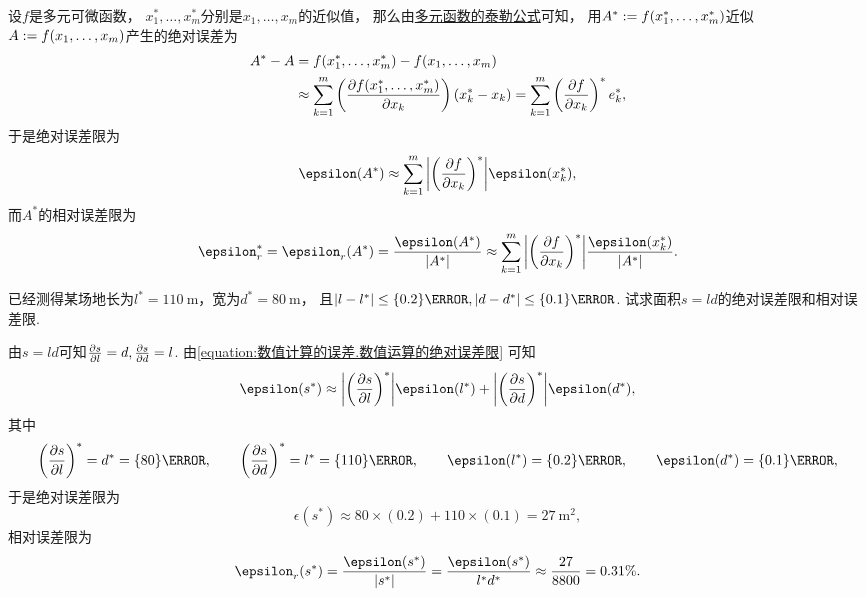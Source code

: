 设\(f\)是多元可微函数，
\(x^*_1,\dotsc,x^*_m\)分别是\(x_1,\dotsc,x_m\)的近似值，
那么由\hyperref[theorem:多元函数微分法.多元函数的泰勒公式]{多元函数的泰勒公式}可知，
用\(A^* := f(x^*_1,\dotsc,x^*_m)\)近似\(A := f(x_1,\dotsc,x_m)\)产生的绝对误差为\begin{align*}
	A^* - A
	&= f(x^*_1,\dotsc,x^*_m) - f(x_1,\dotsc,x_m) \\
	&\approx \sum_{k=1}^m \left( \pdv{f(x^*_1,\dotsc,x^*_m)}{x_k} \right) (x^*_k - x_k)
	= \sum_{k=1}^m \left( \pdv{f}{x_k} \right)^* e^*_k,
\end{align*}
于是绝对误差限为\begin{equation}\label{equation:数值计算的误差.数值运算的绝对误差限}
	\epsilon(A^*)
	\approx \sum_{k=1}^m \abs{\left( \pdv{f}{x_k} \right)^*} \epsilon(x^*_k),
\end{equation}
而\(A^*\)的相对误差限为\begin{equation}\label{equation:数值计算的误差.数值运算的相对误差限}
	\epsilon^*_r
	= \epsilon_r(A^*)
	= \frac{\epsilon(A^*)}{\abs{A^*}}
	\approx \sum_{k=1}^m \abs{\left( \pdv{f}{x_k} \right)^*} \frac{\epsilon(x^*_k)}{\abs{A^*}}.
\end{equation}

\begin{example}
已经测得某场地长为\(l^* = \qty{110}{\meter}\)，宽为\(d^* = \qty{80}{\meter}\)，
且\(
	\abs{l-l^*} \leq \qty{0.2}{\meter},
	\abs{d-d^*} \leq \qty{0.1}{\meter}
\).
试求面积\(s = l d\)的绝对误差限和相对误差限.
\begin{solution}
由\(s = l d\)可知\(\pdv{s}{l} = d, \pdv{s}{d} = l\).
由\cref{equation:数值计算的误差.数值运算的绝对误差限} 可知\begin{equation*}
	\epsilon(s^*)
	\approx \abs{\left( \pdv{s}{l} \right)^*} \epsilon(l^*)
	+ \abs{\left( \pdv{s}{d} \right)^*} \epsilon(d^*),
\end{equation*}
其中\begin{equation*}
	\left( \pdv{s}{l} \right)^*
	= d^*
	= \qty{80}{\meter},
	\qquad
	\left( \pdv{s}{d} \right)^*
	= l^*
	= \qty{110}{\meter},
	\qquad
	\epsilon(l^*) = \qty{0.2}{\meter},
	\qquad
	\epsilon(d^*) = \qty{0.1}{\meter},
\end{equation*}
于是绝对误差限为\begin{equation*}
	\epsilon(s^*)
	\approx 80 \times (0.2) + 110 \times (0.1)
	= \qty{27}{\meter\squared},
\end{equation*}
相对误差限为\begin{equation*}
	\epsilon_r(s^*)
	= \frac{\epsilon(s^*)}{\abs{s^*}}
	= \frac{\epsilon(s^*)}{l^* d^*}
	\approx \frac{27}{8800}
	= 0.31\%.
\end{equation*}
\end{solution}
\end{example}

